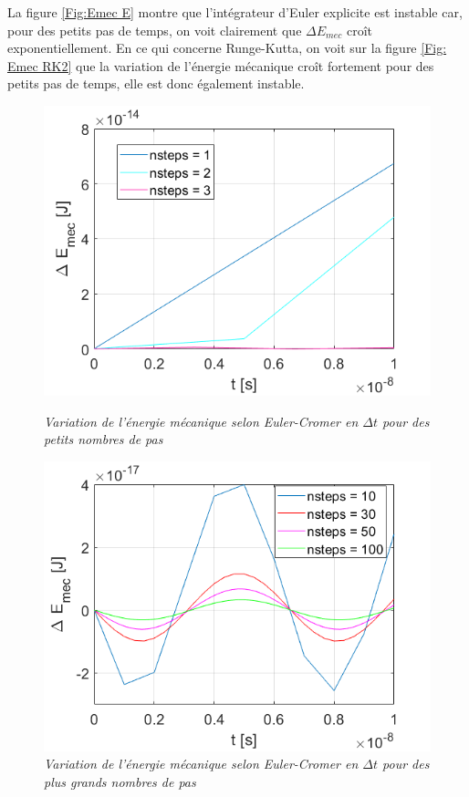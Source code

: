 \documentclass[a4paper,12pt,twoside]{article}
\begin{document}
		\noindent La figure \ref{Fig:Emec E} montre que l'int\'egrateur d'Euler explicite est instable car, pour des petits pas de temps, on voit clairement que $\Delta E_{mec}$ croît exponentiellement. 
		En ce qui concerne Runge-Kutta, on voit sur la figure \ref{Fig: Emec RK2} que la variation de l'\'energie m\'ecanique croît fortement pour des petits pas de temps, elle est donc \'egalement instable.
		
				\begin{figure}[h]
				\begin{minipage}[c]{.46\linewidth}
					\centering
					\includegraphics[scale = 0.6]{D_E_mec_EC_n=1_2_3.png}
					\caption{\em\label{Fig:Emec EC} Variation de l'\'energie m\'ecanique selon Euler-Cromer en $\Delta t$ pour des petits nombres de pas }
				\end{minipage}
				\hfill%
				\begin{minipage}[c]{.46\linewidth}
					\centering
					\includegraphics[scale = 0.6]{D_E_mec_Ec_n=10_20_50_100.png}
					\caption{\em\label{Fig: Emec ECC} Variation de l'\'energie m\'ecanique selon Euler-Cromer en $\Delta t$ pour des plus grands nombres de pas}
				\end{minipage}
			\end{figure}
		
\end{document}
